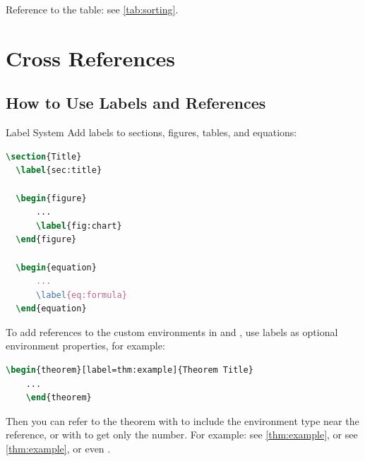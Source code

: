 \documentclass[]{csnotes}
\begin{document}
Reference to the table: see \cref{tab:sorting}.


\section{Cross References}

\subsection{How to Use Labels and References}

\begin{example}{Label System}
Add labels to sections, figures, tables, and equations:
  \begin{lstlisting}[language=TeX]
  \section{Title}
  \label{sec:title}

  \begin{figure}
      ...
      \label{fig:chart}
  \end{figure}

  \begin{equation}
      ...
      \label{eq:formula}
  \end{equation}
  \end{lstlisting}
\end{example}

\begin{warning}{}
  To add references to the custom environments in  and , use labels as optional environment properties, for example:
  \begin{lstlisting}[language=TeX]
    \begin{theorem}[label=thm:example]{Theorem Title}
    ...
    \end{theorem}
  \end{lstlisting}
  Then you can refer to the theorem with  to include the environment type near the reference, or with  to get only the number.
  For example: see \ref{thm:example}, or see \cref{thm:example}, or even .
\end{warning}
\end{document}

